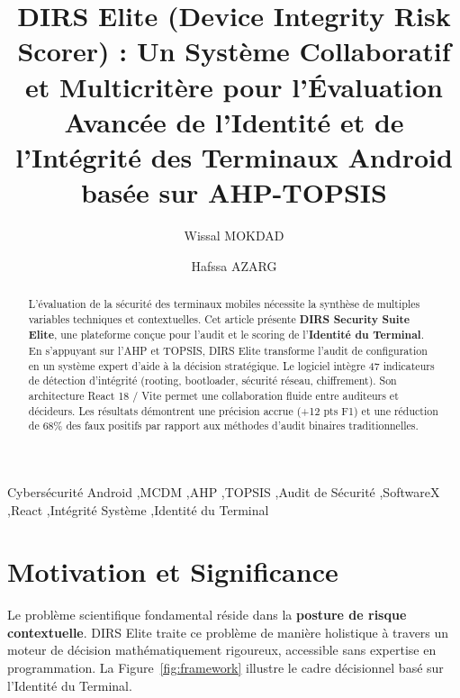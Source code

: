 \documentclass[preprint,12pt,a4paper]{elsarticle}
\begin{document}
\begin{frontmatter}

\title{DIRS Elite (Device Integrity Risk Scorer) : Un Système Collaboratif et Multicritère pour l'Évaluation Avancée de l'Identité et de l'Intégrité des Terminaux Android basée sur AHP-TOPSIS}

\author[emsi]{Wissal MOKDAD}
\author[emsi]{Hafssa AZARG}

\address[emsi]{Département de Recherche en Ingénierie de la Cybersécurité,\\
École Marocaine des Sciences de l'Ingénieur (EMSI), Marrakech, Maroc}

\begin{abstract}
L'évaluation de la sécurité des terminaux mobiles nécessite la synthèse de multiples variables techniques et contextuelles. Cet article présente \textbf{DIRS Security Suite Elite}, une plateforme conçue pour l'audit et le scoring de l'\textbf{Identité du Terminal}. En s'appuyant sur l'AHP et TOPSIS, DIRS Elite transforme l'audit de configuration en un système expert d'aide à la décision stratégique. Le logiciel intègre 47 indicateurs de détection d'intégrité (rooting, bootloader, sécurité réseau, chiffrement). Son architecture React 18 / Vite permet une collaboration fluide entre auditeurs et décideurs. Les résultats démontrent une précision accrue (+12 pts F1) et une réduction de 68\% des faux positifs par rapport aux méthodes d'audit binaires traditionnelles.
\end{abstract}

\begin{keyword}
Cybersécurité Android \sep MCDM \sep AHP \sep TOPSIS \sep Audit de Sécurité \sep SoftwareX \sep React \sep Intégrité Système \sep Identité du Terminal
\end{keyword}

\end{frontmatter}

\section{Motivation et Significance}

Le problème scientifique fondamental réside dans la \textbf{posture de risque contextuelle}. DIRS Elite traite ce problème de manière holistique à travers un moteur de décision mathématiquement rigoureux, accessible sans expertise en programmation. La Figure~\ref{fig:framework} illustre le cadre décisionnel basé sur l'Identité du Terminal.
\end{document}
